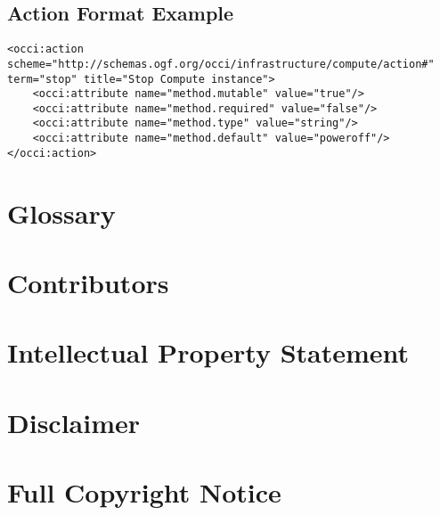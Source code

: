 \documentclass[10pt,a4paper]{article}
\begin{document}
\subsection{Action Format Example}
\label{sec:example_action}
\begin{lstlisting}
<occi:action scheme="http://schemas.ogf.org/occi/infrastructure/compute/action#" term="stop" title="Stop Compute instance">
	<occi:attribute name="method.mutable" value="true"/>
	<occi:attribute name="method.required" value="false"/>
	<occi:attribute name="method.type" value="string"/>
	<occi:attribute name="method.default" value="poweroff"/>
</occi:action>
\end{lstlisting}

\section{Glossary}
\label{sec:glossary}


\section{Contributors}


\section{Intellectual Property Statement}


\section{Disclaimer}


\section{Full Copyright Notice}




\end{document}
